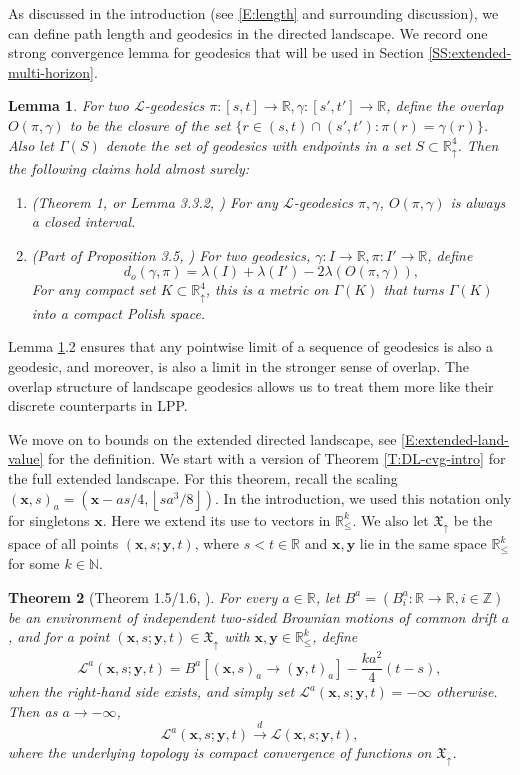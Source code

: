 \documentclass[11pt]{article}
\newcommand{\Z}{\mathbb{Z}}
\newcommand{\N}{\mathbb{N}}
\newcommand{\R}{\mathbb{R}}
\newcommand{\fl}[1]{{\left\lfloor #1 \right\rfloor}}
\newcommand{\sset}{\subset}
\newcommand{\ga}{\gamma}
\newcommand{\Ga}{\Gamma}
\newcommand{\la}{\lambda}
\newcommand{\Rd}{\mathbb{R}^4_\uparrow}
\newcommand{\cL}{\mathcal{L}}
\newcommand{\cvgd}{\stackrel{d}{\to}}
\newcommand{\bx}{\mathbf{x}}
\newcommand{\by}{\mathbf{y}}
\newtheorem{theorem}{Theorem}[section]
\newtheorem{lemma}[theorem]{Lemma}
\theoremstyle{definition} %
\theoremstyle{remark} %
\begin{document}
As discussed in the introduction (see \eqref{E:length} and surrounding discussion), we can define path length and geodesics in the directed landscape. We record one strong convergence lemma for geodesics that will be used in Section \ref{SS:extended-multi-horizon}.
\begin{lemma}
	\label{L:overlap-cvg}
	For two $\cL$-geodesics $\pi:[s, t] \to \R, \ga:[s', t'] \to \R$, define the overlap $O(\pi, \ga)$ to be the closure of the set $\{r \in (s, t) \cap (s', t') : \pi(r) =\ga(r)\}$. Also let $\Ga(S)$ denote the set of geodesics with endpoints in a set $S \sset \Rd$.
	Then the following claims hold almost surely:
	\begin{enumerate}
		\item (Theorem 1, \cite{bhatia2023duality} or Lemma 3.3.2, \cite{dauvergne202327})  For any $\cL$-geodesics $\pi, \ga$, $O(\pi, \ga)$ is always a closed interval.
		\item (Part of Proposition 3.5, \cite{dauvergne202327}) For two geodesics, $\ga:I \to \R, \pi:I' \to \R$, define 
		$$
		d_o(\ga, \pi) = \la(I) + \la(I') - 2 \la (O(\pi, \ga)),
		$$
		For any compact set $K \sset \Rd$, this is a metric on $\Ga(K)$ that turns $\Ga(K)$ into a compact Polish space.
	\end{enumerate}
\end{lemma}

Lemma \ref{L:overlap-cvg}.2 ensures that any pointwise limit of a sequence of geodesics is also a geodesic, and moreover, is also a limit in the stronger sense of overlap. The overlap structure of landscape geodesics allows us to treat them more like their discrete counterparts in LPP.

We move on to bounds on the extended directed landscape, see \eqref{E:extended-land-value} for the definition. We start with a version of Theorem \ref{T:DL-cvg-intro} for the full extended landscape. For this theorem, recall the scaling $(\bx,s)_a =(\bx - as/4, \fl{s a^3/8})$. In the introduction, we used this notation only for singletons $\bx$. Here we extend its use to vectors in $\R^k_\le$. We also let $\mathfrak X_\uparrow$ be the space of all points $(\bx, s; \by, t)$, where $s < t \in \R$ and $\bx, \by$ lie in the same space $\R^k_\le$ for some $k \in \N$.

\begin{theorem}[Theorem 1.5/1.6, \cite{dauvergne2021disjoint}]
	\label{T:DL-cvg-extended}
	For every $a \in \R$, let $B^a = (B^a_i:\R \to \R, i \in \Z)$ be an environment of independent two-sided Brownian motions of common drift $a$, and for a point $(\bx, s; \by, t) \in \mathfrak X_\uparrow$ with $\bx, \by \in \R^k_\le$, define
	$$
	\cL^a(\bx, s; \by, t) = B^a[(\bx,s)_a \to (\by,t)_a] - \frac{ka^2}{4}(t-s),
	$$
	when the right-hand side exists, and simply set $\cL^a(\bx, s; \by, t) = -\infty$ otherwise. 
	Then as $a \to - \infty$,
	$$
	\cL^a(\bx, s; \by, t) \cvgd \cL(\bx, s; \by, t),
	$$
	where the underlying topology is compact convergence of functions on $\mathfrak{X}_\uparrow$.
\end{theorem}
\end{document}
